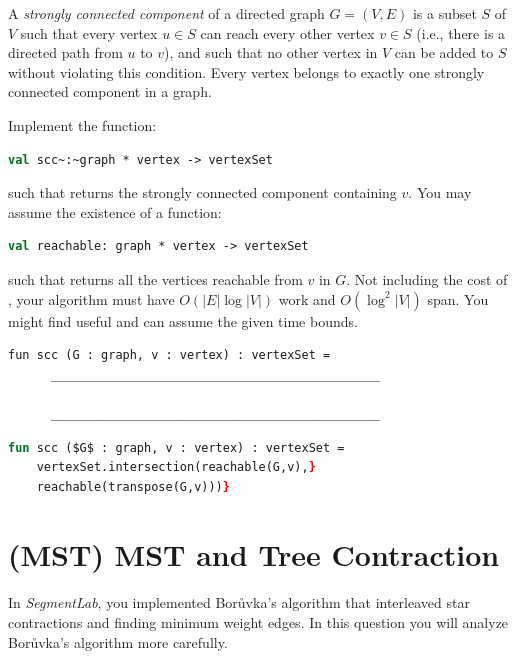 \begin{problem}[10.]
A \emph{strongly connected component} of a directed graph $G = (V,E)$ is a subset $S$ of $V$ such
that every vertex $u \in S$ can reach every other vertex $v \in S$ (i.e.,
there is a directed path from $u$ to $v$), and such that no other vertex in
$V$ can be added to $S$ without violating this condition. Every vertex
belongs to exactly one strongly connected component{} in a graph.

\ask
Implement the function:
\begin{lstlisting}[language=ocaml,numbers=none]
val scc~:~graph * vertex -> vertexSet
\end{lstlisting}
such that  returns the strongly connected component{} containing $v$. You may assume
the existence of a function:
\begin{lstlisting}[language=ocaml,numbers=none]
val reachable: graph * vertex -> vertexSet
\end{lstlisting}
such that  returns all the vertices reachable from $v$
in $G$. Not including the cost of , your algorithm must
have $O(|E|\log|V|)$ work and $O(\log^2 |V|)$ span.  You might find
 useful and can assume the given time bounds.


\begin{lstlisting}[numbers=none]
fun scc (G : graph, v : vertex) : vertexSet = 
      ______________________________________________

      ______________________________________________
\end{lstlisting}

\sol
\begin{lstlisting}[language=ocaml,numbers=none]
fun scc ($G$ : graph, v : vertex) : vertexSet = 
    vertexSet.intersection(reachable(G,v),}
    reachable(transpose(G,v)))}
\end{lstlisting}

\end{problem}


\section{(MST) MST and Tree Contraction}

In \emph{SegmentLab}, you implemented Bor\r{u}vka's algorithm that
interleaved star contractions and finding minimum weight edges.  In
this question you will analyze Bor\r{u}vka's algorithm more carefully.

